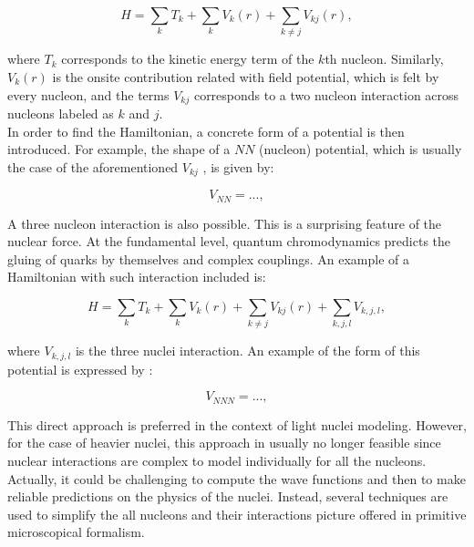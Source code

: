 \documentclass[openany]{book}
\begin{document}
\begin{equation} \label{eq:micro_hamiltonian}
	H = \sum_{k} T_k + \sum_{k} V_k (r) + \sum_{k \neq j} V_{kj}(r),
\end{equation}

where $T_k$ corresponds to the kinetic energy term of the $k$th nucleon. Similarly, $V_k(r)$ is the onsite contribution related with field potential, which is felt by every nucleon, and the terms $V_{kj}$ corresponds to a two nucleon interaction across nucleons labeled as $k$ and $j$. \\

In order to find the Hamiltonian, a concrete form of a potential is then introduced. For example, the shape of a $NN$ (nucleon) potential, which is usually the case of the aforementioned $V_{kj}$ ,  is given by:

\begin{equation} \label{eq:micro_NN}
	V_{NN} = ..., 
\end{equation}

A three nucleon interaction is also possible. This is a surprising feature of the nuclear force. At the fundamental level, quantum chromodynamics predicts the gluing of quarks by themselves and complex couplings. An example of a Hamiltonian with such interaction included is:

\begin{equation} \label{eq:micro_hamiltonian_NNN}
	H = \sum_{k} T_k + \sum_{k} V_k (r) + \sum_{k \neq j} V_{kj}(r) +   \sum_{k, j ,l } {V_{k, j, l}} , 
\end{equation}

where $V_{k, j, l}$ is the three nuclei interaction. An example of the form of this potential is expressed by : 

\begin{equation} \label{eq:micro_NNN}
	V_{NNN} = ..., 
\end{equation}


This direct approach is preferred in the context of light nuclei modeling. However, for the case of heavier nuclei, this approach in usually no longer feasible since nuclear interactions are complex to model individually for all the nucleons. Actually, it could be challenging to compute the wave functions and then to make reliable predictions on the physics of the nuclei. Instead, several techniques are used to simplify the all nucleons and their interactions picture offered in primitive microscopical formalism. \\
\end{document}
